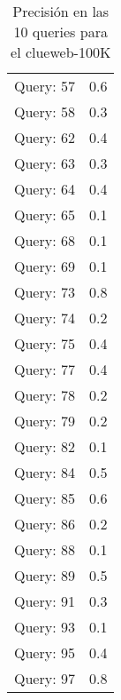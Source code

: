\begin{table}[hbtp]
\begin{tabular}{cc}
Query: 57&0.6
\\
Query: 58&0.3
\\
Query: 62&0.4
\\
Query: 63&0.3
\\
Query: 64&0.4
\\
Query: 65&0.1
\\
Query: 68&0.1
\\
Query: 69&0.1
\\
Query: 73&0.8
\\
Query: 74&0.2
\\
Query: 75&0.4
\\
Query: 77&0.4
\\
Query: 78&0.2
\\
Query: 79&0.2
\\
Query: 82&0.1
\\
Query: 84&0.5
\\
Query: 85&0.6
\\
Query: 86&0.2
\\
Query: 88&0.1
\\
Query: 89&0.5
\\
Query: 91&0.3
\\
Query: 93&0.1
\\
Query: 95&0.4
\\
Query: 97&0.8
\\
\end{tabular}
\caption{Precisi\'{o}n en las 10 queries para el clueweb-100K}
\end{table}
